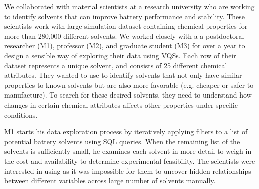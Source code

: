 \par\noindent{} We collaborated with material scientists at a research university who are working to identify solvents that can improve battery performance and stability. These scientists work with large simulation dataset containing chemical properties for more than 280,000 different solvents. We worked closely with a a postdoctoral researcher (M1), professor (M2), and graduate student (M3) for over a year to design a sensible way of exploring their data using VQSs. Each row of their dataset represents a unique solvent, and consists of 25 different chemical attributes. They wanted to use \zv to identify solvents that not only have similar properties to known solvents but are also more favorable (e.g. cheaper or safer to manufacture). To search for these desired solvents, they need to understand how changes in certain chemical attributes affects other properties under specific conditions.
\par M1 starts his data exploration process by iteratively applying filters to a list of potential battery solvents using SQL queries. When the remaining list of the solvents is sufficiently small, he examines each solvent in more detail to weigh in the cost and availability to determine experimental feasibility. The scientists were interested in using \zv as it was impossible for them to uncover hidden relationships between different variables across large number of solvents manually.%